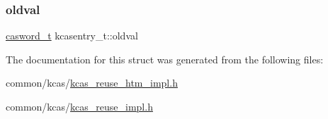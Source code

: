 \mbox{\label{structkcasentry__t_a9043bad3ce4e0a566196667d039f3380}} 
\subsubsection{\texorpdfstring{oldval}{oldval}}
{\footnotesize\ttfamily \hyperlink{rq__unsafe_8h_ad45142aaf2ff20a036dc6242b8483e9c}{casword\+\_\+t} kcasentry\+\_\+t\+::oldval}



The documentation for this struct was generated from the following files\+:\begin{DoxyCompactItemize}
\item 
common/kcas/\hyperlink{kcas__reuse__htm__impl_8h}{kcas\+\_\+reuse\+\_\+htm\+\_\+impl.\+h}\item 
common/kcas/\hyperlink{kcas__reuse__impl_8h}{kcas\+\_\+reuse\+\_\+impl.\+h}\end{DoxyCompactItemize}

